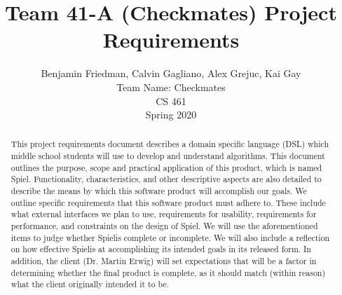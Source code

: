 \documentclass[10pt,letter,draftclsnofoot,onecolumn]{IEEEtran}
\begin{document}
\newcommand\name{Spiel}

%
%
\title{Team 41-A (Checkmates) Project Requirements}
\author{Benjamin Friedman, Calvin Gagliano, Alex Grejuc, Kai Gay\\
Team Name: Checkmates \\
CS 461\\
Spring 2020\\
}


\begin{titlepage}
        \maketitle
        

        \begin{singlespace}
        \begin{abstract}
            This project requirements document describes a domain specific language (DSL) which middle school students will use to develop and understand algorithms. This document outlines the purpose, scope and practical application of this product, which is named \name. Functionality, characteristics, and other descriptive aspects are also detailed to describe the means by which this software product will accomplish our goals. We outline specific requirements that this software product must adhere to. These include what external interfaces we plan to use, requirements for usability, requirements for performance, and constraints on the design of \name. We will use the aforementioned items to judge whether \name is complete or incomplete. We will also include a reflection on how effective \name is at accomplishing its intended goals in its released form. In addition, the client (Dr. Martin Erwig) will set expectations that will be a factor in determining whether the final product is complete, as it should match (within reason) what the client originally intended it to be.
        \end{abstract}
        \end{singlespace}
\end{titlepage}
 
\end{document}
